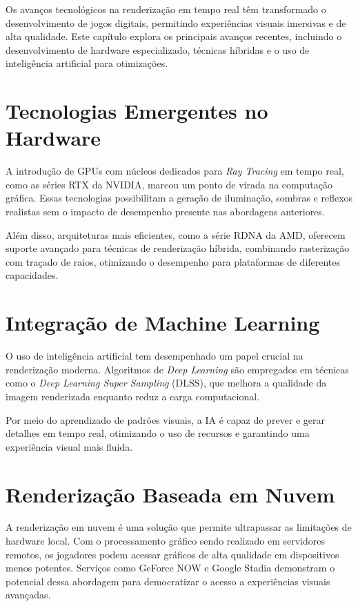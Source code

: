 \makeatletter
\renewcommand{\chapter}{%
  \if@openright\cleardoublepage\else\clearpage\fi %
  \secdef{\@chapter}{\@schapter}}
\makeatother
\chapter{Avanços na Renderização em Tempo Real}

Os avanços tecnológicos na renderização em tempo real têm transformado o desenvolvimento de jogos digitais, permitindo experiências visuais imersivas e de alta qualidade. Este capítulo explora os principais avanços recentes, incluindo o desenvolvimento de hardware especializado, técnicas híbridas e o uso de inteligência artificial para otimizações.

\section{Tecnologias Emergentes no Hardware}
A introdução de GPUs com núcleos dedicados para \textit{Ray Tracing} em tempo real, como as séries RTX da NVIDIA, marcou um ponto de virada na computação gráfica. Essas tecnologias possibilitam a geração de iluminação, sombras e reflexos realistas sem o impacto de desempenho presente nas abordagens anteriores.

Além disso, arquiteturas mais eficientes, como a série RDNA da AMD, oferecem suporte avançado para técnicas de renderização híbrida, combinando rasterização com traçado de raios, otimizando o desempenho para plataformas de diferentes capacidades.

\section{Integração de Machine Learning}
O uso de inteligência artificial tem desempenhado um papel crucial na renderização moderna. Algoritmos de \textit{Deep Learning} são empregados em técnicas como o \textit{Deep Learning Super Sampling} (DLSS), que melhora a qualidade da imagem renderizada enquanto reduz a carga computacional.

Por meio do aprendizado de padrões visuais, a IA é capaz de prever e gerar detalhes em tempo real, otimizando o uso de recursos e garantindo uma experiência visual mais fluida.

\section{Renderização Baseada em Nuvem}
A renderização em nuvem é uma solução que permite ultrapassar as limitações de hardware local. Com o processamento gráfico sendo realizado em servidores remotos, os jogadores podem acessar gráficos de alta qualidade em dispositivos menos potentes. Serviços como GeForce NOW e Google Stadia demonstram o potencial dessa abordagem para democratizar o acesso a experiências visuais avançadas.

